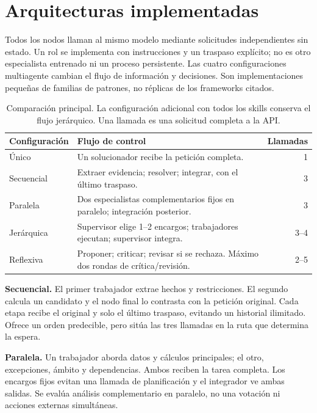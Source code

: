\section{Arquitecturas implementadas}
Todos los nodos llaman al mismo modelo mediante solicitudes independientes sin estado. Un rol se implementa con instrucciones y un traspaso explícito; no es otro especialista entrenado ni un proceso persistente. Las cuatro configuraciones multiagente cambian el flujo de información y decisiones. Son implementaciones pequeñas de familias de patrones, no réplicas de los frameworks citados.

\begin{table}[htbp]
\centering\small
\begin{tabular}{@{}p{26mm}p{91mm}r@{}}
\toprule
\textbf{Configuración} & \textbf{Flujo de control} & \textbf{Llamadas}\\
\midrule
Único & Un solucionador recibe la petición completa. & 1\\
Secuencial & Extraer evidencia; resolver; integrar, con el último traspaso. & 3\\
Paralela & Dos especialistas complementarios fijos en paralelo; integración posterior. & 3\\
Jerárquica & Supervisor elige 1--2 encargos; trabajadores ejecutan; supervisor integra. & 3--4\\
Reflexiva & Proponer; criticar; revisar si se rechaza. Máximo dos rondas de crítica/revisión. & 2--5\\
\bottomrule
\end{tabular}
\caption{Comparación principal. La configuración adicional con todos los skills conserva el flujo jerárquico. Una llamada es una solicitud completa a la API.}
\label{tab:architectures}
\end{table}

\textbf{Secuencial.} El primer trabajador extrae hechos y restricciones. El segundo calcula un candidato y el nodo final lo contrasta con la petición original. Cada etapa recibe el original y solo el último traspaso, evitando un historial ilimitado. Ofrece un orden predecible, pero sitúa las tres llamadas en la ruta que determina la espera.

\textbf{Paralela.} Un trabajador aborda datos y cálculos principales; el otro, excepciones, ámbito y dependencias. Ambos reciben la tarea completa. Los encargos fijos evitan una llamada de planificación y el integrador ve ambas salidas. Se evalúa análisis complementario en paralelo, no una votación ni acciones externas simultáneas.

